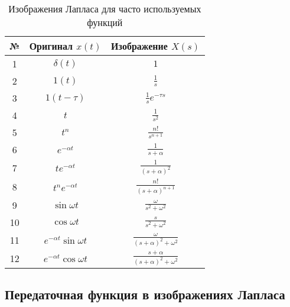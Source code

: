 \documentclass[../../TAU.tex]{subfiles}
\begin{document}
    \begin{table}[H]
        \begin{center}
            \begin{tabular}{|c|c|c|}
            \hline 
                №  & Оригинал $x(t)$                & Изображение $X(s)$                       \\[1.4ex] \hline
                1  & $\delta(t)$                    & $1$                                      \\[1.4ex] \hline
                2  & $1(t)$                         & $\frac{1}{s}$                            \\[1.4ex] \hline
                3  & $1(t-\tau)$                    & $\frac{1}{s} e^{-\tau s}$                \\[1.4ex] \hline
                4  & $t$                            & $\frac{1}{s^2}$                          \\[1.4ex] \hline
                5  & $t^n$                          & $\frac{n!}{s^{n+1}}$                     \\[1.4ex] \hline
                6  & $e^{-\alpha t}$                & $\frac{1}{s+\alpha}$                     \\[1.4ex] \hline
                7  & $t e^{-\alpha t}$              & $\frac{1}{(s+\alpha)^2}$                 \\[1.4ex] \hline
                8  & $t^n e^{-\alpha t}$            & $\frac{n!}{(s+\alpha)^{n+1}}$            \\[1.4ex] \hline
                9  & $\sin{\omega t}$               & $\frac{\omega}{s^2 + \omega^2}$          \\[1.4ex] \hline
                10 & $\cos{\omega t}$               & $\frac{s}{s^2+\omega^2}$                 \\[1.4ex] \hline
                11 & $e^{-\alpha t} \sin{\omega t}$ & $\frac{\omega}{(s+\alpha)^2+\omega^2}$   \\[1.4ex] \hline
                12 & $e^{-\alpha t} \cos{\omega t}$ & $\frac{s+\alpha}{(s+\alpha)^2+\omega^2}$ \\[1.4ex] \hline
            \end{tabular}
            \caption{Изображения Лапласа для часто используемых функций}
        \end{center}
    \end{table}
 
 \subsection{Передаточная функция в изображениях Лапласа}
\end{document}
